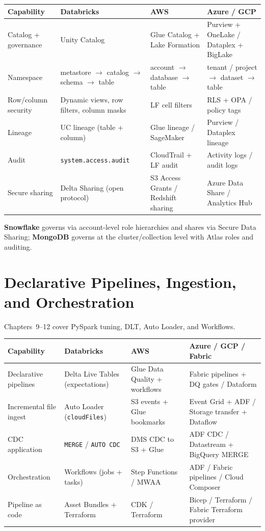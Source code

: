 \begin{center}
\footnotesize
\begin{tabular}{@{}p{3.0cm}p{3.4cm}p{3.2cm}p{3.2cm}@{}}
\toprule
\textbf{Capability} & \textbf{Databricks} & \textbf{AWS} & \textbf{Azure / GCP} \\
\midrule
Catalog + governance & Unity Catalog & Glue Catalog + Lake Formation & Purview + OneLake / Dataplex + BigLake \\
Namespace & metastore $\rightarrow$ catalog $\rightarrow$ schema $\rightarrow$ table & account $\rightarrow$ database $\rightarrow$ table & tenant / project $\rightarrow$ dataset $\rightarrow$ table \\
Row/column security & Dynamic views, row filters, column masks & LF cell filters & RLS + OPA / policy tags \\
Lineage & UC lineage (table + column) & Glue lineage / SageMaker & Purview / Dataplex lineage \\
Audit & \texttt{system.access.audit} & CloudTrail + LF audit & Activity logs / audit logs \\
Secure sharing & Delta Sharing (open protocol) & S3 Access Grants / Redshift sharing & Azure Data Share / Analytics Hub \\
\bottomrule
\end{tabular}
\end{center}

\noindent \textbf{Snowflake} governs via account-level role hierarchies and shares
via Secure Data Sharing; \textbf{MongoDB} governs at the cluster/collection level
with Atlas roles and auditing.

\section{Declarative Pipelines, Ingestion, and Orchestration}
%
Chapters~9--12 cover PySpark tuning, DLT, Auto Loader, and Workflows.

\begin{center}
\footnotesize
\begin{tabular}{@{}p{3.0cm}p{3.4cm}p{3.2cm}p{3.2cm}@{}}
\toprule
\textbf{Capability} & \textbf{Databricks} & \textbf{AWS} & \textbf{Azure / GCP / Fabric} \\
\midrule
Declarative pipelines & Delta Live Tables (expectations) & Glue Data Quality + workflows & Fabric pipelines + DQ gates / Dataform \\
Incremental file ingest & Auto Loader (\texttt{cloudFiles}) & S3 events + Glue bookmarks & Event Grid + ADF / Storage transfer + Dataflow \\
CDC application & \texttt{MERGE} / \texttt{AUTO CDC} & DMS CDC to S3 + Glue & ADF CDC / Datastream + BigQuery MERGE \\
Orchestration & Workflows (jobs + tasks) & Step Functions / MWAA & ADF / Fabric pipelines / Cloud Composer \\
Pipeline as code & Asset Bundles + Terraform & CDK / Terraform & Bicep / Terraform / Fabric Terraform provider \\
\bottomrule
\end{tabular}
\end{center}

